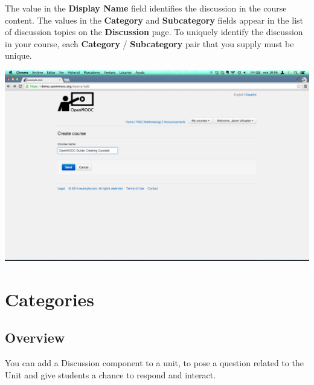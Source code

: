 \documentclass[letterpaper,10pt,english]{sphinxmanual}
\begin{document}
\begin{enumerate}
The value in the \textbf{Display Name} field identifies the discussion in the
course content. The values in the \textbf{Category} and \textbf{Subcategory} fields
appear in the list of discussion topics on the \textbf{Discussion} page. To
uniquely identify the discussion in your course, each \textbf{Category} /
\textbf{Subcategory} pair that you supply must be unique.

\includegraphics{3_create_course-3.png}

\end{enumerate}


\chapter{Categories}
\label{categories::doc}\label{categories:categories}\label{categories:id1}

\section{Overview}
\label{categories:overview}
You can add a Discussion component to a unit, to pose a question related to the
Unit and give students a chance to respond and interact.
\end{document}
